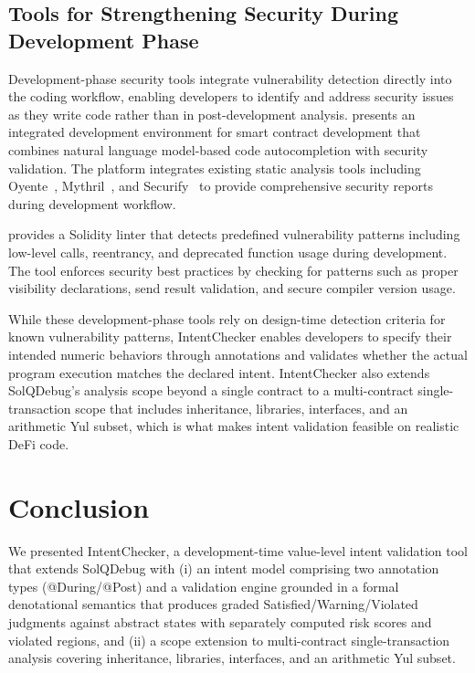 \documentclass[pdflatex,sn-basic]{sn-jnl}%
\theoremstyle{thmstyleone}%
\theoremstyle{thmstyletwo}%
\theoremstyle{thmstylethree}%
\begin{document}
\subsection{Tools for Strengthening Security During Development Phase}
Development-phase security tools integrate vulnerability detection directly into the coding workflow, enabling developers to identify and address security issues as they write code rather than in post-development analysis.
\citep{making} presents an integrated development environment for smart contract development that combines natural language model-based code autocompletion with security validation.
The platform integrates existing static analysis tools including Oyente~\citep{oyente}, Mythril~\citep{mythril}, and Securify~\citep{securify} to provide comprehensive security reports during development workflow.

\citep{solhint} provides a Solidity linter that detects predefined vulnerability patterns including low-level calls, reentrancy, and deprecated function usage during development.
The tool enforces security best practices by checking for patterns such as proper visibility declarations, send result validation, and secure compiler version usage.

While these development-phase tools rely on design-time detection criteria for known vulnerability patterns,
IntentChecker enables developers to specify their intended numeric behaviors through annotations and validates whether the actual program execution matches the declared intent.
IntentChecker also extends SolQDebug's analysis scope beyond a single contract to a multi-contract single-transaction scope that includes inheritance, libraries, interfaces, and an arithmetic Yul subset, which is what makes intent validation feasible on realistic DeFi code.

\section{Conclusion}\label{sec:conclusion}

We presented IntentChecker, a development-time value-level intent validation tool that extends SolQDebug with (i) an intent model comprising two annotation types (@During/@Post) and a validation engine grounded in a formal denotational semantics that produces graded Satisfied/Warning/Violated judgments against abstract states with separately computed risk scores and violated regions, and (ii) a scope extension to multi-contract single-transaction analysis covering inheritance, libraries, interfaces, and an arithmetic Yul subset.
\end{document}

